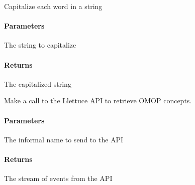 \documentclass[letterpaper,10pt,english]{sphinxmanual}
\begin{document}
\begin{fulllineitems}
\label{\detokenize{autoapi/ui/index:ui.capitalize_words}}
\pysigstartsignatures
{}
\pysigstopsignatures
\sphinxAtStartPar
Capitalize each word in a string


\paragraph{Parameters}
\label{\detokenize{autoapi/ui/index:id1}}\begin{description}
\sphinxAtStartPar
The string to capitalize

\end{description}


\paragraph{Returns}
\label{\detokenize{autoapi/ui/index:returns}}\begin{description}
\sphinxAtStartPar
The capitalized string

\end{description}

\end{fulllineitems}


\begin{fulllineitems}
\label{\detokenize{autoapi/ui/index:ui.make_api_call}}
\pysigstartsignatures
{}
\pysigstopsignatures
\sphinxAtStartPar
Make a call to the Llettuce API to retrieve OMOP concepts.


\paragraph{Parameters}
\label{\detokenize{autoapi/ui/index:id2}}\begin{description}
\sphinxAtStartPar
The informal name to send to the API

\end{description}


\paragraph{Returns}
\label{\detokenize{autoapi/ui/index:id3}}\begin{description}
\sphinxAtStartPar
The stream of events from the API

\end{description}

\end{fulllineitems}
\end{document}
